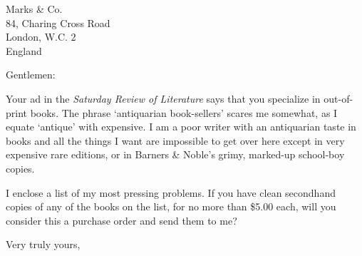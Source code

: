 \documentclass{letter}
\date{October 5, 1949}
\begin{document}
\begin{letter}{Marks \& Co.\\84, Charing Cross Road\\London, W.C. 2\\England}
\opening{Gentlemen:}

Your ad in the \textit{Saturday Review of Literature} says that you specialize in out-of-print books. The phrase `antiquarian book-sellers' scares me somewhat, as I equate `antique' with expensive. I am a poor writer with an antiquarian taste in books and all the things I want are impossible to get over here except in very expensive rare editions, or in Barners \& Noble's grimy, marked-up school-boy copies.

I enclose a list of my most pressing problems. If you have clean secondhand copies of any of the books on the list, for no more than \$5.00 each, will you consider this a purchase order and send them to me?

\closing{Very truly yours,}
\end{letter}
\end{document}
